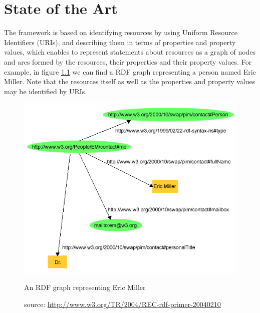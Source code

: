 \chapter{State of the Art}\label{cha:stateoftheart}


	The framework is based on identifying resources by using Uniform Resource Identifiers (URIs), and describing them in terms of properties and property values, which enables to represent statements about resources as a graph of nodes and arcs formed by the resources, their properties and their property values. For example, in figure \ref{fig:rdfexample} we can find a RDF graph representing a person named Eric Miller. Note that the resources itself as well as the properties and property values may be identified by URIs.
	\begin{figure}
	  \centering
	  \includegraphics[width=.5\textwidth]{fig/rdfexample}
	  \caption{An RDF graph representing Eric Miller}
	  \caption*{source: \url{http://www.w3.org/TR/2004/REC-rdf-primer-20040210}}
	  \label{fig:rdfexample}
	\end{figure}
